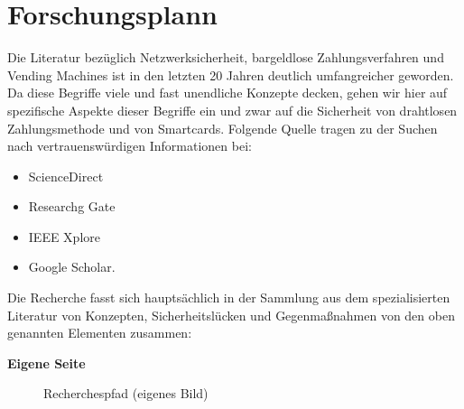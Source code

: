 \section{Forschungsplann}

Die Literatur bezüglich Netzwerksicherheit, bargeldlose Zahlungsverfahren und Vending Machines ist 
in den letzten 20 Jahren deutlich umfangreicher geworden. Da diese Begriffe viele und fast unendliche 
Konzepte decken, gehen wir hier auf spezifische Aspekte dieser Begriffe ein und zwar 
auf die Sicherheit von drahtlosen Zahlungsmethode und von Smartcards. Folgende Quelle tragen zu der
Suchen nach vertrauenswürdigen Informationen bei:

\begin{itemize}
    \item ScienceDirect
    \item Researchg Gate
    \item IEEE Xplore
    \item Google Scholar.
\end{itemize}

Die Recherche fasst sich hauptsächlich in der Sammlung aus dem spezialisierten Literatur von Konzepten,
Sicherheitslücken und Gegenmaßnahmen von den oben genannten Elementen zusammen:

\textbf{Eigene Seite}
\vfill
\begin{figure}[htb]
    \caption{Recherchespfad (eigenes Bild)}
    \label{fig:diagramrecherche}
\end{figure}
\vfill
